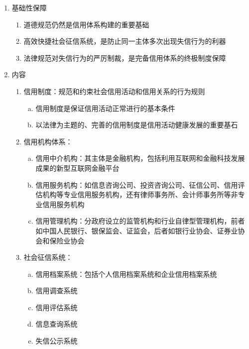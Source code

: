 \documentclass[12pt]{book}
\begin{document}
\begin{enumerate}[1.]
    \item 基础性保障
          \begin{enumerate}[(1)]
              \item 道德规范仍然是信用体系构建的重要基础
              \item 高效快捷社会征信系统，是防止同一主体多次出现失信行为的利器
              \item 法律规范对失信行为的严厉制裁，是完备信用体系的终极制度保障
          \end{enumerate}
    \item 内容
          \begin{enumerate}[(1)]
              \item 信用制度：规范和约束社会信用活动和信用关系的行为规则
                    \begin{enumerate}[a.]
                        \item 信用制度是保证信用活动正常进行的基本条件
                        \item 以法律为主题的、完善的信用制度是信用活动健康发展的重要基石
                    \end{enumerate}
              \item 信用机构体系：
                    \begin{enumerate}[a.]
                        \item 信用中介机构：其主体是金融机构，包括利用互联网和金融科技发展成果的新型互联网金融平台
                        \item 信用服务机构：如信息咨询公司、投资咨询公司、征信公司、信用评估机构等专业信用服务机构，还有律师事务所、会计师事务所等非专业信用服务机构
                        \item 信用管理机构：分政府设立的监管机构和行业自律型管理机构，前者如中国人民银行、银保监会、证监会，后者如银行业协会、证券业协会和保险业协会
                    \end{enumerate}
              \item 社会征信系统：
                    \begin{enumerate}[a.]
                        \item 信用档案系统：包括个人信用档案系统和企业信用档案系统
                        \item 信用调查系统
                        \item 信用评估系统
                        \item 信息查询系统
                        \item 失信公示系统
                    \end{enumerate}
          \end{enumerate}
\end{enumerate}
\end{document}
